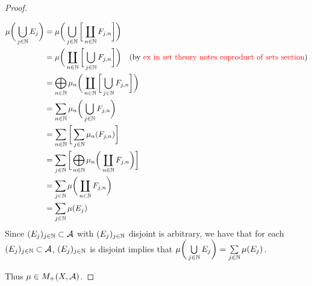 \documentclass{book}
\begin{document}
\begin{proof}
\begin{enumerate}
		\begin{align*}
			\mu \bigg( \bigcup\limits_{j \in \mathbb{N}} E_j \bigg)
			& = \mu \bigg( \bigcup\limits_{j \in \mathbb{N}} \bigg[ \coprod\limits_{n \in \mathbb{N}} F_{j,n} \bigg] \bigg) \\
			& = \mu \bigg( \coprod\limits_{n \in \mathbb{N}} \bigg[ \bigcup\limits_{j \in \mathbb{N}} F_{j,n} \bigg] \bigg) \quad \text{(by \textcolor{red}{ex in set theory notes coproduct of sets section})} \\
			& = \bigoplus_{n \in \mathbb{N}} \mu_n \bigg( \coprod\limits_{n \in \mathbb{N}} \bigg[ \bigcup\limits_{j \in \mathbb{N}} F_{j,n} \bigg] \bigg) \\
			& = \sum\limits_{n \in \mathbb{N}} \mu_n \bigg( \bigcup\limits_{j \in \mathbb{N}} F_{j,n} \bigg) \\
			& = \sum\limits_{n \in \mathbb{N}} \bigg[ \sum\limits_{j \in \mathbb{N}} \mu_n(F_{j,n}) \bigg] \\
			& = \sum\limits_{j \in \mathbb{N}} \bigg[ \bigoplus_{n \in \mathbb{N}} \mu_n \bigg( \coprod\limits_{n \in \mathbb{N}} F_{j,n} \bigg) \bigg] \\
			& = \sum\limits_{j \in \mathbb{N}} \mu \bigg( \coprod\limits_{n \in \mathbb{N}} F_{j,n} \bigg) \\
			& = \sum\limits_{j \in \mathbb{N}}  \mu (E_j)  \\
		\end{align*}
		Since $(E_j)_{j \in \mathbb{N}} \subset \mathcal{A}$ with $(E_j)_{j \in \mathbb{N}}$ disjoint is arbitrary, we have that for each $(E_j)_{j \in \mathbb{N}} \subset \mathcal{A}$, $(E_j)_{j \in \mathbb{N}}$ is disjoint implies that $\mu \bigg( \bigcup\limits_{j \in \mathbb{N}} E_j \bigg) = \sum\limits_{j \in \mathbb{N}}  \mu (E_j)$.
	\end{enumerate}
	Thus $\mu \in M_+(X, \mathcal{A})$.
\end{proof}








































	
	
\end{document}

